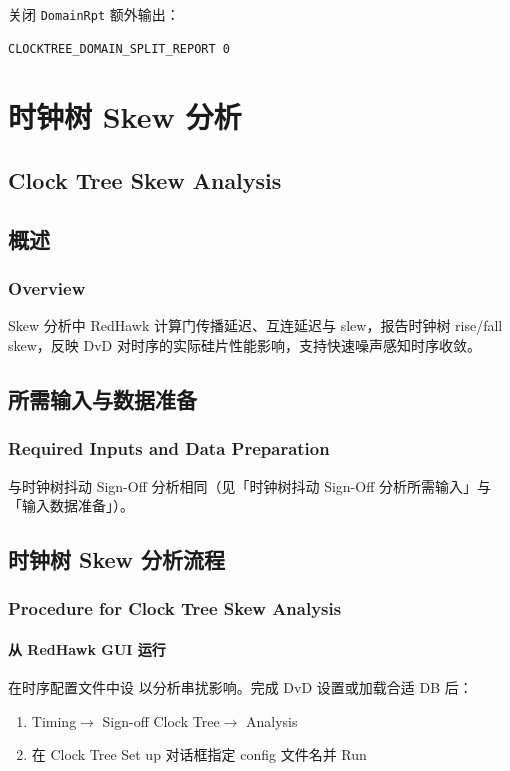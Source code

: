 关闭 \texttt{DomainRpt} 额外输出：
\begin{lstlisting}
CLOCKTREE_DOMAIN_SPLIT_REPORT 0
\end{lstlisting}


\section{时钟树 Skew 分析}
\subsection*{Clock Tree Skew Analysis}

\subsection{概述}
\subsubsection*{Overview}

Skew 分析中 RedHawk 计算门传播延迟、互连延迟与 slew，报告时钟树 rise/fall skew，反映 DvD 对时序的实际硅片性能影响，支持快速噪声感知时序收敛。

\subsection{所需输入与数据准备}
\subsubsection*{Required Inputs and Data Preparation}

与时钟树抖动 Sign-Off 分析相同（见「时钟树抖动 Sign-Off 分析所需输入」与「输入数据准备」）。

\subsection{时钟树 Skew 分析流程}
\subsubsection*{Procedure for Clock Tree Skew Analysis}

\paragraph{从 RedHawk GUI 运行}
在时序配置文件中设  以分析串扰影响。完成 DvD 设置或加载合适 DB 后：
\begin{enumerate}
  \item Timing$\rightarrow$ Sign-off Clock Tree$\rightarrow$ Analysis
  \item 在 Clock Tree Set up 对话框指定 config 文件名并 Run
\end{enumerate}

